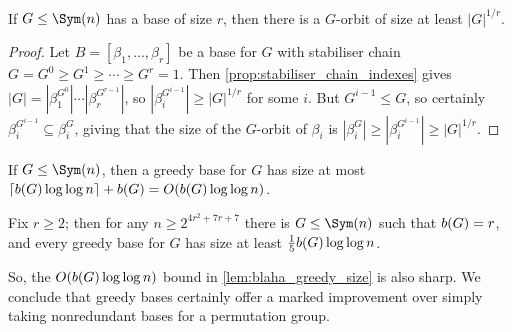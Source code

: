 \begin{lemma}\label{lem:blaha_greedy_orbit}
    If $G \leq \Sym(n)$ has a base of size $r$, then there is a $G$-orbit of size at least $|G|^{1/r}$.
\end{lemma}

\begin{proof}
    Let $B = [\beta_1,\dotsc,\beta_r]$ be a base for $G$ with stabiliser chain $G = G^0 \geq G^1 \geq \dotsb \geq G^r = 1$. Then \autoref{prop:stabiliser_chain_indexes} gives $|G| = |\beta_1^{G^0}| \dotsb |\beta_r^{G^{r-1}}|$, so $|\beta_i^{G^{i-1}}| \geq |G|^{1/r}$ for some $i$. But $G^{i-1} \leq G$, so certainly $\beta_i^{G^{i-1}} \subseteq \beta_i^G$, giving that the size of the $G$-orbit of $\beta_i$ is $|\beta_i^G| \geq |\beta_i^{G^{i-1}}| \geq |G|^{1/r}$.
\end{proof}

\begin{theorem}\label{lem:blaha_greedy_size}
    If $G \leq \Sym(n)$, then a greedy base for $G$ has size at most $\lceil \added{2}{b(G)}\log\log n \rceil + \added{2}{b(G)} = O(\added{2}{b(G)}\log\log n)$.
\end{theorem}




\begin{theorem}\label{thm:blaha_greedy_sharp}
    Fix $r \geq 2$; then for any $n \geq 2^{4r^2 + 7r + 7}$ there is $G \leq \Sym(n)$ such that $\added{2}{b(G)} = r$, and every greedy base for $G$ has size at least $\frac{1}{5}\added{2}{b(G)}\log\log n$.
\end{theorem}


So, the $O(\added{2}{b(G)}\log\log n)$ bound in \autoref{lem:blaha_greedy_size} is also sharp. We conclude that greedy bases certainly offer a marked improvement over simply taking nonredundant bases for a permutation group.